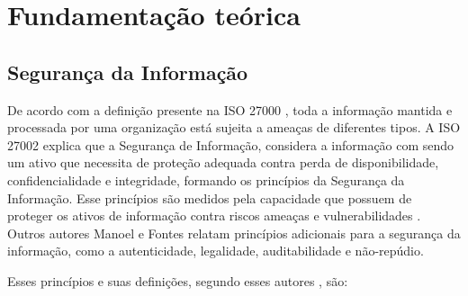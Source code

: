 \chapter{\label{chap:intro}Fundamentação teórica}

\section{Segurança da Informação}

De acordo com a definição presente na ISO 27000 \cite{ISO27000}, toda a informação mantida e processada por uma organização está sujeita a ameaças de diferentes tipos. A ISO 27002 explica que a Segurança de Informação, considera a informação com sendo um ativo que necessita de proteção adequada contra perda de disponibilidade, confidencialidade e integridade, formando os princípios da Segurança da Informação. Esse princípios são medidos pela capacidade que possuem de proteger os ativos de informação contra riscos ameaças e vulnerabilidades  \cite{hintzbergen2018fundamentos}. Outros autores  Manoel \cite{da2014governancca} e Fontes \cite{fontes2017segurancca}  relatam  princípios adicionais para a segurança da informação, como a autenticidade, legalidade, auditabilidade e não-repúdio. 

Esses princípios e suas definições, segundo esses autores \cite{da2014governancca,fontes2017segurancca}, são:

